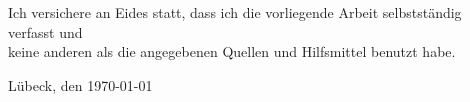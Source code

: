 \thispagestyle{empty}

\vspace*{7cm}
Ich versichere an Eides statt, dass ich die vorliegende Arbeit selbstständig verfasst und\\
keine anderen als die angegebenen Quellen und Hilfsmittel benutzt habe.

\vspace*{3cm}
Lübeck, den \today
